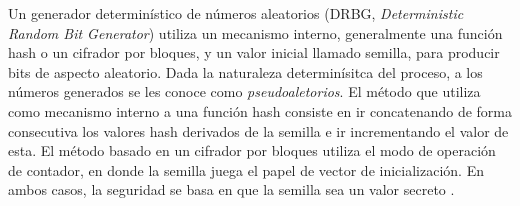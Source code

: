 Un generador determinístico de números aleatorios (DRBG,
\textit{Deterministic Random Bit Generator}) utiliza un mecanismo interno,
generalmente una función hash o un cifrador por bloques, y un valor inicial
llamado semilla, para producir bits de aspecto aleatorio. Dada la naturaleza
determinísitca del proceso, a los números generados se les conoce como
\textit{pseudoaletorios}. El método que utiliza como mecanismo interno a una
función hash consiste en ir concatenando de forma consecutiva los valores hash
derivados de la semilla e ir incrementando el valor de esta. El método basado en
un cifrador por bloques utiliza el modo de operación de contador,
en donde la semilla juega el papel de vector de inicialización. En ambos casos,
la seguridad se basa en que la semilla sea un valor secreto
\cite{nist_aleatorios}.
